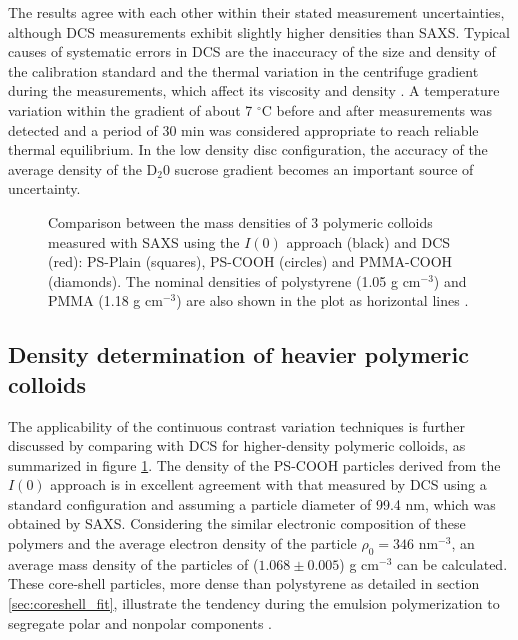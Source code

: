 The results agree with each other within their stated measurement uncertainties, although DCS measurements exhibit slightly higher densities than SAXS. Typical causes of systematic errors in DCS are the inaccuracy of the size and density of the calibration standard and the thermal variation in the centrifuge gradient during the measurements, which affect its viscosity and density \citep{kamiti_simultaneous_2012}. A temperature variation within the gradient of about 7 $^{\circ}$C before and after measurements was detected and a period of 30 min was considered appropriate to reach reliable thermal equilibrium. In the low density disc configuration, the accuracy of the average density of the D$_2$0 sucrose gradient becomes an important source of uncertainty.
\begin{figure}
	\begin{center}
		
	\end{center}
	\caption[Mass densities of 3 polymeric colloids measured with SAXS and DCS.]{Comparison between the mass densities of 3 polymeric colloids measured with SAXS using the $I(0)$ approach (black) and DCS (red): PS-Plain (squares), PS-COOH (circles) and PMMA-COOH (diamonds). The nominal densities of polystyrene (1.05 g cm$^{-3}$) and PMMA (1.18 g cm$^{-3}$) are also shown in the plot as horizontal lines \citep{dingenouts_analysis_1999}.}
	\label{fig:DensityComparison}
\end{figure}

\subsection{Density determination of heavier polymeric colloids}
The applicability of the continuous contrast variation techniques is further discussed by comparing with DCS for higher-density polymeric colloids, as summarized in figure \ref{fig:DensityComparison}. The density of the PS-COOH particles derived from the $I(0)$ approach is in excellent agreement with that measured by DCS using a standard configuration and assuming a particle diameter of 99.4 nm, which was obtained by SAXS. Considering the similar electronic composition of these polymers and the average electron density of the particle $\rho_0=346$ nm\(^{-3}\), an average mass density of the particles of ($1.068\pm0.005$) g cm$^{-3}$ can be calculated. These core-shell particles, more dense than polystyrene as detailed in section \ref{sec:coreshell_fit}, illustrate the tendency during the emulsion polymerization to segregate polar and nonpolar components \citep{dingenouts_structure_1994}.

